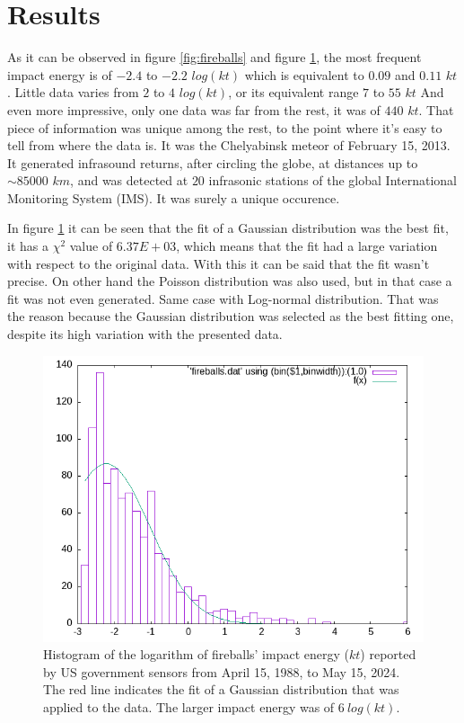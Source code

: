 \documentclass[
	a4paper, %
	10pt, %
	unnumberedsections, %
	twoside, %
]{LTJournalArticle}
\begin{document}
\section{Results}

As it can be observed in figure \ref{fig:fireballs} and figure \ref{fig:gaussian}, the most frequent
impact energy is of $-2.4$ to $-2.2$ $log(kt)$ which is equivalent to $0.09$ and $0.11$ $kt$. Little
data varies from $2$ to $4$ $log(kt)$, or its equivalent range $7$ to $55$ $kt$ And even more
impressive, only one data was far from the rest, it was of $440$ $kt$. That piece of information was
unique among the rest, to the point where it's easy to tell from where the data is. It was the
Chelyabinsk meteor of February 15, 2013. It generated infrasound returns, after circling the globe,
at distances up to $\sim85000$ $km$, and was detected at $20$ infrasonic stations of the global
International Monitoring System (IMS). \supercite{rusia2013} It was surely a unique occurence.

In figure \ref{fig:gaussian} it can be seen that the fit of a Gaussian distribution was the best fit,
it has a $\chi^2$ value of $6.37E+03$, which means that the fit had a large variation with respect to
the original data. With this it can be said that the fit wasn't precise. On other hand the Poisson
distribution was also used, but in that case a fit was not even generated. Same case with Log-normal
distribution. That was the reason because the Gaussian distribution was selected as the best fitting
one, despite its high variation with the presented data.

\begin{figure}[H] %
	\includegraphics[width=\linewidth]{fit.png}
	\caption{Histogram of the logarithm of fireballs' impact energy ($kt$) reported by US government sensors from April 15, 1988, to May 15, 2024. The red line indicates the fit of a Gaussian distribution that was applied to the data. The larger impact energy was of $6\:log(kt)$.}
	\label{fig:gaussian}
\end{figure}
\end{document}
